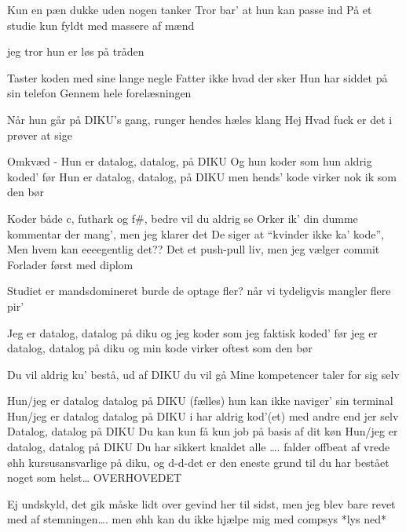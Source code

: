 \documentclass[a4paper,11pt]{article}
\begin{document}
\begin{song}

%
Kun en pæn dukke uden nogen tanker
Tror bar’ at hun kan passe ind
På et studie kun fyldt med massere af mænd

%
jeg tror hun er løs på tråden 

%
Taster koden med sine lange negle
Fatter ikke hvad der sker 
Hun har siddet på sin telefon
Gennem hele forelæsningen 

%
Når hun går på DIKU’s gang, runger hendes hæles klang
%
Hej Hvad fuck er det i prøver at sige


%
Omkvæd -     Hun er datalog, datalog, på DIKU
Og hun koder som hun aldrig koded’ før
Hun er datalog, datalog, på DIKU
men hends’ kode virker nok ik som den bør

%
Koder både c, futhark og f#, bedre vil du aldrig se 
Orker ik’ din dumme kommentar der mang’, men jeg klarer det
De siger at “kvinder ikke ka’ kode”, 
Men hvem kan eeeegentlig det??
Det et push-pull liv, men jeg vælger commit
Forlader først med diplom

%
Studiet er mandsdomineret burde de optage fler?
når vi tydeligvis mangler flere pir’

%
Jeg er datalog, datalog på diku
og jeg koder som jeg faktisk koded’ før
jeg er datalog, datalog på diku
og min kode virker oftest som den bør 

%
Du vil aldrig ku’ bestå, ud af DIKU du vil gå
%
Mine kompetencer taler for sig selv


%
Hun/jeg er datalog datalog på DIKU (fælles)
%
hun kan ikke naviger’ sin terminal %
Hun/jeg er datalog datalog på DIKU %
i har aldrig kod'(et) med andre end jer selv
%
Datalog, datalog på DIKU
Du kan kun få kun job på basis af dit køn
%
Hun/jeg er datalog, datalog på DIKU
Du har sikkert knaldet alle ….
falder offbeat af vrede 
øhh kursusansvarlige på diku, og d-d-det er den eneste grund til du har bestået noget som helst… OVERHOVEDET 
\end{song}
\begin{sketch}
Ej undskyld, det gik måske lidt over gevind her til sidst, men jeg blev bare revet med af stemningen…. men øhh kan du ikke hjælpe mig med compsys
*lys ned*
\end{sketch}
\end{document}
